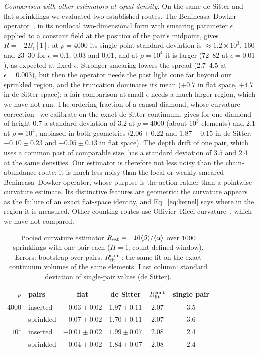 \documentclass[prd,twocolumn,superscriptaddress,nofootinbib,amsmath,amssymb,floatfix]{revtex4-2}
\begin{document}
\emph{Comparison with other estimators at equal density.} On the same de Sitter and flat sprinklings we evaluated two established routes. The Benincasa--Dowker operator~\cite{BD10}, in its nonlocal two-dimensional form with smearing parameter $\epsilon$, applied to a constant field at the position of the pair's midpoint, gives $R=-2B_\epsilon[1]$: at $\rho=4000$ its single-point standard deviation is $\approx1.2\times10^3$, $160$ and $23$--$30$ for $\epsilon=0.1$, $0.03$ and $0.01$, and at $\rho=10^4$ it is larger ($72$--$82$ at $\epsilon=0.01$), as expected at fixed $\epsilon$. Stronger smearing lowers the spread ($2.7$--$4.5$ at $\epsilon=0.003$), but then the operator needs the past light cone far beyond our sprinkled region, and the truncation dominates its mean ($+0.7$ in flat space, $+4.7$ in de Sitter space); a fair comparison at small $\epsilon$ needs a much larger region, which we have not run. The ordering fraction of a causal diamond, whose curvature correction~\cite{RSS13} we calibrate on the exact de Sitter continuum, gives for one diamond of height $0.7$ a standard deviation of $3.2$ at $\rho=4000$ (about $10^3$ elements) and $2.1$ at $\rho=10^4$, unbiased in both geometries ($2.06\pm0.22$ and $1.87\pm0.15$ in de Sitter, $-0.10\pm0.23$ and $-0.05\pm0.13$ in flat space). The depth drift of one pair, which uses a common past of comparable size, has a standard deviation of $3.5$ and $2.4$ at the same densities. Our estimator is therefore not less noisy than the chain-abundance route; it is much less noisy than the local or weakly smeared Benincasa--Dowker operator, whose purpose is the action rather than a pointwise curvature estimate. Its distinctive features are geometric: the curvature appears as the failure of an exact flat-space identity, and Eq.~\eqref{eq:kernel} says where in the region it is measured. Other counting routes use Ollivier--Ricci curvature~\cite{BBR26}, which we have not compared.

\begin{table}[t]
\caption{Pooled curvature estimator $R_{\rm est}=-16\langle\beta\rangle/\langle\alpha\rangle$ over 1000 sprinklings with one pair each ($H=1$; count-defined window). Errors: bootstrap over pairs. $R_{\rm fit}^{\rm cont}$: the same fit on the exact continuum volumes of the same elements. Last column: standard deviation of single-pair values (de Sitter).}
\label{tab:rest}
\begin{ruledtabular}
\begin{tabular}{rlcccc}
$\rho$ & pairs & flat & de Sitter & $R_{\rm fit}^{\rm cont}$ & single pair\\
\hline
4000 & inserted & $-0.03\pm0.02$ & $1.97\pm0.11$ & $2.07$ & $3.5$\\
 & sprinkled & $-0.07\pm0.02$ & $1.70\pm0.11$ & $2.07$ & $3.6$\\
$10^4$ & inserted & $-0.01\pm0.02$ & $1.99\pm0.07$ & $2.08$ & $2.4$\\
 & sprinkled & $-0.04\pm0.02$ & $1.84\pm0.07$ & $2.08$ & $2.4$\\
\end{tabular}
\end{ruledtabular}
\end{table}
\end{document}
